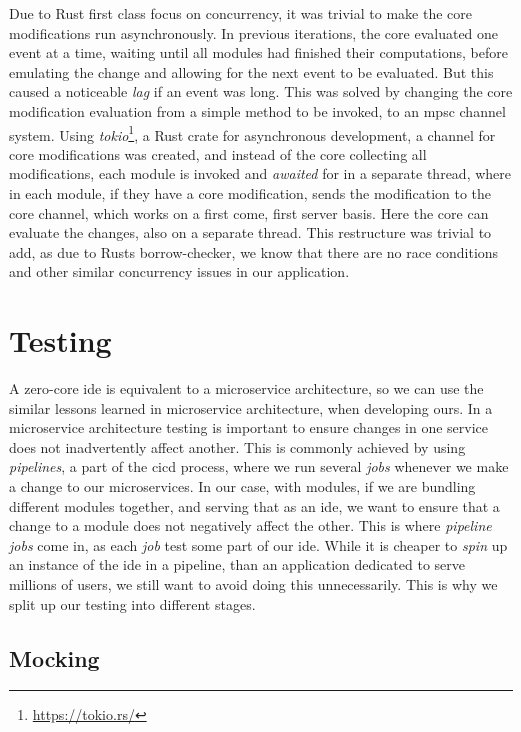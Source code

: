 Due to Rust first class focus on concurrency, it was trivial to make the core
modifications run asynchronously. In previous iterations, the core evaluated
one event at a time, waiting until all modules had finished their computations,
before emulating the change and allowing for the next event to be evaluated. But
this caused a noticeable \textit{lag} if an event was long. This was solved by
changing the core modification evaluation from a simple method to be invoked, to
an \gls*{mpsc} channel system. Using \textit{tokio}\footnote{\url{https://tokio.rs/}},
a Rust crate for asynchronous development, a channel for core modifications was
created, and instead of the core collecting all modifications, each module is
invoked and \textit{awaited} for in a separate thread, where in each module, if
they have a core modification, sends the modification to the core channel, which
works on a first come, first server basis. Here the core can evaluate the
changes, also on a separate thread. This restructure was trivial to add, as due
to Rusts borrow-checker, we know that there are no race conditions and other
similar concurrency issues in our application.


\section{Testing} \label{sec:testing}

A zero-core \gls*{ide} is equivalent to a microservice architecture, so we can
use the similar lessons learned in microservice architecture, when developing
ours. In a microservice architecture testing is important to ensure changes in
one service does not inadvertently affect another. This is commonly achieved by
using \textit{pipelines}, a part of the \gls*{cicd} process, where we run
several \textit{jobs} whenever we make a change to our microservices. In our
case, with modules, if we are bundling different modules together, and serving
that as an \gls*{ide}, we want to ensure that a change to a module does not
negatively affect the other. This is where \textit{pipeline jobs} come in, as
each \textit{job} test some part of our \gls*{ide}. While it is cheaper to
\textit{spin} up an instance of the \gls*{ide} in a pipeline, than an
application dedicated to serve millions of users, we still want to avoid doing
this unnecessarily. This is why we split up our testing into different stages.


\subsection{Mocking}

